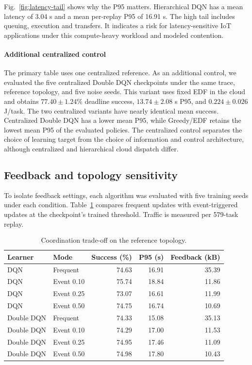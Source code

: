 Fig.~\ref{fig:latency-tail} shows why the P95 matters. Hierarchical
DQN has a mean latency of 3.04 s and a mean per-replay P95 of
16.91 s. The high tail includes queuing, execution and transfers.
It indicates a risk for latency-sensitive IoT applications under
this compute-heavy workload and modeled contention.

\paragraph{Additional centralized control}
The primary table uses one centralized reference. As an additional
control, we evaluated the five centralized Double DQN checkpoints
under the same trace, reference topology, and five noise seeds. This
variant uses fixed EDF in the cloud and obtains $77.40\pm1.24$\%
deadline success, $13.74\pm2.08$ s P95, and $0.224\pm0.026$ J/task.
The two centralized variants have nearly identical mean success.
Centralized Double DQN has a lower mean P95, while Greedy/EDF
retains the lowest mean P95 of the evaluated policies. The
centralized control separates the choice of learning target from
the choice of information and control architecture, although
centralized and hierarchical cloud dispatch differ.

\subsection{Feedback and topology sensitivity}
To isolate feedback settings, each algorithm was evaluated with five
training seeds under each condition. Table~\ref{tab:feedback} compares
frequent updates with event-triggered updates at the checkpoint's
trained threshold. Traffic is measured per 579-task replay.

\begin{table}[t]
\centering
\caption{Coordination trade-off on the reference topology.}
\label{tab:feedback}
\footnotesize
\setlength{\tabcolsep}{4pt}
\begin{tabular}{@{}llrrr@{}}
\toprule
Learner & Mode & Success (\%) & P95 (s) & Feedback (kB) \\
\midrule
DQN & Frequent & 74.63 & 16.91 & 35.39 \\
DQN & Event 0.10 & 75.74 & 18.84 & 11.86 \\
DQN & Event 0.25 & 73.07 & 16.61 & 11.99 \\
DQN & Event 0.50 & 74.75 & 16.74 & 10.69 \\
Double DQN & Frequent & 74.33 & 15.08 & 35.13 \\
Double DQN & Event 0.10 & 74.29 & 17.00 & 11.53 \\
Double DQN & Event 0.25 & 74.95 & 17.46 & 11.09 \\
Double DQN & Event 0.50 & 74.98 & 17.80 & 10.43 \\
\bottomrule
\end{tabular}
\end{table}

